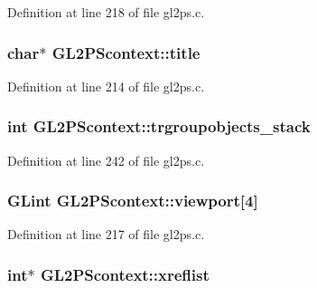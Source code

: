 Definition at line 218 of file gl2ps.\+c.

\hypertarget{struct_g_l2_p_scontext_a7134771c0c60d5295f47567c44b0dee0}{}
\subsubsection[{title}]{\setlength{\rightskip}{0pt plus 5cm}char$\ast$ G\+L2\+P\+Scontext\+::title}\label{struct_g_l2_p_scontext_a7134771c0c60d5295f47567c44b0dee0}


Definition at line 214 of file gl2ps.\+c.

\hypertarget{struct_g_l2_p_scontext_a07c002428c9a4bc607c0ae2db2ca5524}{}
\subsubsection[{trgroupobjects\+\_\+stack}]{\setlength{\rightskip}{0pt plus 5cm}int G\+L2\+P\+Scontext\+::trgroupobjects\+\_\+stack}\label{struct_g_l2_p_scontext_a07c002428c9a4bc607c0ae2db2ca5524}


Definition at line 242 of file gl2ps.\+c.

\hypertarget{struct_g_l2_p_scontext_a39ea8db5482d4ea55283dea4334916cc}{}
\subsubsection[{viewport}]{\setlength{\rightskip}{0pt plus 5cm}G\+Lint G\+L2\+P\+Scontext\+::viewport\mbox{[}4\mbox{]}}\label{struct_g_l2_p_scontext_a39ea8db5482d4ea55283dea4334916cc}


Definition at line 217 of file gl2ps.\+c.

\hypertarget{struct_g_l2_p_scontext_ae9e5f2fb03b2de75f3c96c7eefaca9c8}{}
\subsubsection[{xreflist}]{\setlength{\rightskip}{0pt plus 5cm}int$\ast$ G\+L2\+P\+Scontext\+::xreflist}\label{struct_g_l2_p_scontext_ae9e5f2fb03b2de75f3c96c7eefaca9c8}


